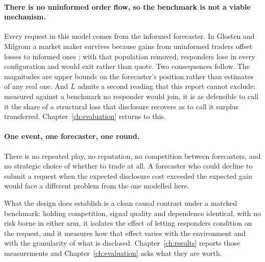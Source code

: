 \paragraph{There is no uninformed order flow, so the benchmark is not a viable mechanism.}
Every request in this model comes from the informed forecaster. In Glosten and Milgrom a
market maker survives because gains from uninformed traders offset losses to informed ones
\cite{glosten1985bidask}; with that population removed, responders lose in every
configuration and would exit rather than quote. Two consequences follow. The magnitudes are
upper bounds on the forecaster's position rather than estimates of any real one. And $L$
admits a second reading that this report cannot exclude: measured against a benchmark no
responder would join, it is as defensible to call it the share of a structural loss that
disclosure recovers as to call it surplus transferred. Chapter~\ref{ch:evaluation} returns
to this.

\paragraph{One event, one forecaster, one round.} There is no repeated play, no reputation,
no competition between forecasters, and no strategic choice of whether to trade at all. A
forecaster who could decline to submit a request when the expected disclosure cost exceeded
the expected gain would face a different problem from the one modelled here.

What the design does establish is a clean causal contrast under a matched benchmark: holding
competition, signal quality and dependence identical, with no risk borne in either arm, it
isolates the effect of
letting responders condition on the request, and it measures how that effect varies with the
environment and with the granularity of what is disclosed. Chapter~\ref{ch:results} reports
those measurements and Chapter~\ref{ch:evaluation} asks what they are worth.
